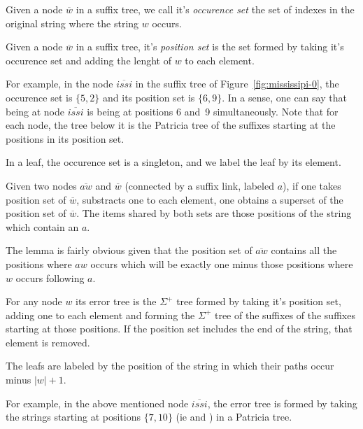 \begin{definition}
Given a node $\overline{w}$ in a suffix tree, we call it's \emph{occurence set} the set of indexes in the original string where the string $w$ occurs.
\end{definition}

\begin{definition}
Given a node $\overline{w}$ in a suffix tree, it's \emph{position set} is the set formed by taking it's occurence set and adding the lenght of $w$ to each element.
\end{definition}

For example, in the node $\overline{issi}$ in the suffix tree of Figure~\ref{fig:mississipi-0}, the occurence set is $\{5, 2\}$ and its position set is $\{6, 9\}$. In a sense, one can say that being at node $\overline{issi}$ is being at positions 6 and~9 simultaneously. Note that for each node, the tree below it is the Patricia tree of the suffixes starting at the positions in its position set.

In a leaf, the occurence set is a singleton, and we label the leaf by its element.

\begin{lemma}\label{lemma:suffix-error}
Given two nodes $\overline{aw}$ and $\overline{w}$ (connected by a suffix link, labeled $a$), if one takes position set of $\overline{w}$, substracts one to each element, one obtains a superset of the position set of $\overline{w}$. The items shared by both sets are those positions of the string which contain an $a$.
\end{lemma}

The lemma is fairly obvious given that the position set of $\overline{aw}$ contains all the positions where $aw$ occurs which will be exactly one minus those positions where $w$ occurs following $a$.

\begin{definition}
For any node $w$ its error tree is the $\Sigma^+$ tree formed by taking it's position set, adding one to each element and forming the $\Sigma^+$ tree of the suffixes of the suffixes starting at those positions. If the position set includes the end of the string, that element is removed.

The leafs are labeled by the position of the string in which their paths occur minus $|w| + 1$.
\end{definition}

For example, in the above mentioned node $\overline{issi}$, the error tree is formed by taking the strings starting at positions $\{7, 10\}$ (ie  and ) in a Patricia tree.

